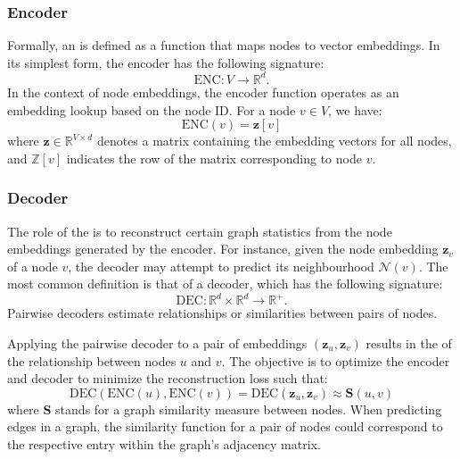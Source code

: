 

\subsubsection{Encoder}
Formally, an  is defined as a function that maps nodes to vector embeddings. In its simplest form, the encoder has the following signature:
\begin{equation*}
    \text{ENC}: V \to \mathbb{R}^d.
\end{equation*}
In the context of  node embeddings, the encoder function operates as an embedding lookup based on the node ID. For a node $ v\in V $, we have:
\begin{equation}\label{eq:encoderLookup}
    \text{ENC}(v) = \mathbf{z}[v]
\end{equation}
where $ \mathbf{z}\in \mathbb{R}^{V\times d} $ denotes a matrix containing the embedding vectors for all nodes, and $ \mathbb{Z}[v] $ indicates the row of the matrix corresponding to node $ v $.

\subsubsection{Decoder}\label{sec:decoder}
The role of the  is to reconstruct certain graph statistics from the node embeddings generated by the encoder. For instance, given the node embedding $ \mathbf{z}_v $ of a node $ v $, the decoder may attempt to predict its neighbourhood $ \mathcal{N}(v) $. The most common definition is that of a  decoder, which has the following signature:
\begin{equation*}
    \text{DEC}: \mathbb{R}^d \times \mathbb{R}^d \to \mathbb{R}^+.
\end{equation*}
Pairwise decoders estimate relationships or similarities between pairs of nodes. 

Applying the pairwise decoder to a pair of embeddings $ (\mathbf{z}_u, \mathbf{z}_v) $ results in the  of the relationship between nodes $ u $ and $ v $. The objective is to optimize the encoder and decoder to minimize the reconstruction loss such that:
\begin{equation}\label{eq:reconstruction}
    \text{DEC}(\text{ENC}(u), \text{ENC}(v)) = \text{DEC}(\mathbf{z}_u, \mathbf{z}_v) \approx \textbf{S}(u,v)
\end{equation}
where $ \textbf{S} $ stands for a graph similarity measure between nodes. When predicting edges in a graph, the similarity function for a pair of nodes could correspond to the respective entry within the graph's adjacency matrix.

